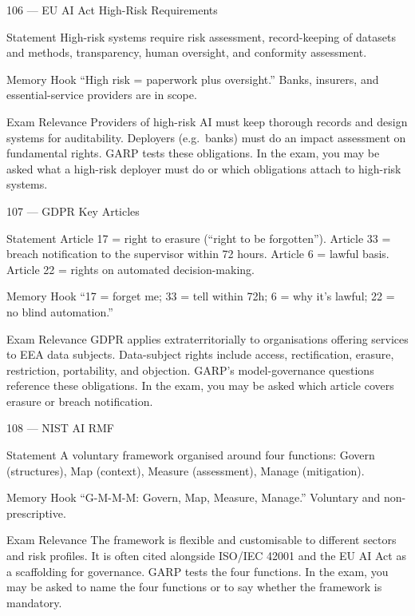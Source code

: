 \documentclass[aspectratio=169,8pt]{beamer}
\begin{document}
	\begin{frame}{106 --- EU AI Act High-Risk Requirements}
		\begin{block}{Statement}
			High-risk systems require risk assessment, record-keeping of datasets and methods, transparency, human oversight, and conformity assessment.
		\end{block}
		\begin{block}{Memory Hook}
			``High risk = paperwork plus oversight.'' Banks, insurers, and essential-service providers are in scope.
		\end{block}
		\begin{block}{Exam Relevance}
			Providers of high-risk AI must keep thorough records and design systems for auditability. Deployers (e.g.\ banks) must do an impact assessment on fundamental rights. GARP tests these obligations. In the exam, you may be asked what a high-risk deployer must do or which obligations attach to high-risk systems.
		\end{block}
	\end{frame}
	
	\begin{frame}{107 --- GDPR Key Articles}
		\begin{block}{Statement}
			Article 17 = right to erasure (``right to be forgotten''). Article 33 = breach notification to the supervisor within 72 hours. Article 6 = lawful basis. Article 22 = rights on automated decision-making.
		\end{block}
		\begin{block}{Memory Hook}
			``17 = forget me; 33 = tell within 72h; 6 = why it's lawful; 22 = no blind automation.''
		\end{block}
		\begin{block}{Exam Relevance}
			GDPR applies extraterritorially to organisations offering services to EEA data subjects. Data-subject rights include access, rectification, erasure, restriction, portability, and objection. GARP's model-governance questions reference these obligations. In the exam, you may be asked which article covers erasure or breach notification.
		\end{block}
	\end{frame}
	
	\begin{frame}{108 --- NIST AI RMF}
		\begin{block}{Statement}
			A voluntary framework organised around four functions: Govern (structures), Map (context), Measure (assessment), Manage (mitigation).
		\end{block}
		\begin{block}{Memory Hook}
			``G-M-M-M: Govern, Map, Measure, Manage.'' Voluntary and non-prescriptive.
		\end{block}
		\begin{block}{Exam Relevance}
			The framework is flexible and customisable to different sectors and risk profiles. It is often cited alongside ISO/IEC 42001 and the EU AI Act as a scaffolding for governance. GARP tests the four functions. In the exam, you may be asked to name the four functions or to say whether the framework is mandatory.
		\end{block}
	\end{frame}
	
\end{document}

